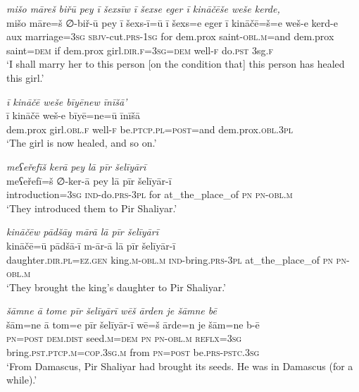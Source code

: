 \ea \label{ZP.90}
\textit{mišo māreš biřū pey ī šexsīw ī šexse eger ī kināčēše weše kerde,} \\ 
\gll mišo māre=š ∅-biř-ū pey ī šexs-ī=ū ī šexs=e eger ī kināčē=š=e weš-e kerd-e \\ 
 aux marriage\textsc{=3sg} \textsc{sbjv-}cut\textsc{.prs}\textsc{-\textsc{1sg}} for dem.prox saint\textsc{-obl}\textsc{.m}=and dem.prox saint\textsc{=dem} if dem.prox girl\textsc{.dir}\textsc{.f}\textsc{=3sg}\textsc{=dem} well\textsc{-f} do\textsc{.pst} 3sg\textsc{.f} \\ 
\glt `I shall marry her to this person [on the condition that] this person has healed this girl.'
\z 
 
\ea \label{ZP.91}
\textit{ī kināčē weše bīyēnew īnīšā’} \\ 
\gll ī kināčē weš-e bīyē=ne=ū īnīšā \\ 
 dem.prox girl\textsc{.obl}\textsc{.f} well\textsc{-f} be\textsc{.ptcp}\textsc{.pl}\textsc{=\textsc{post}}=and dem.prox\textsc{.obl}\textsc{.3pl} \\ 
\glt `The girl is now healed, and so on.'
\z 
 
\ea \label{ZP.92}
\textit{meʕeřefīš kerā pey lā pīr šelīyārī} \\ 
\gll meʕeřefī=š ∅-ker-ā pey lā pīr šelīyār-ī \\ 
 introduction\textsc{=3sg} \textsc{ind-}do\textsc{.prs}\textsc{-3pl} for at\_the\_place\_of \textsc{pn} \textsc{pn}\textsc{-obl}\textsc{.m} \\ 
\glt `They introduced them to Pir Shaliyar.'
\z 
 
\ea \label{ZP.93}
\textit{kināčēw pādšāy mārā lā pīr šelīyārī} \\ 
\gll kināčē=ū pādšā-ī m-ār-ā lā pīr šelīyār-ī \\ 
 daughter\textsc{.dir}\textsc{.pl}\textsc{\textsc{=ez.gen}} king\textsc{.m}\textsc{-obl}\textsc{.m} \textsc{ind-}bring\textsc{.prs}\textsc{-3pl} at\_the\_place\_of \textsc{pn} \textsc{pn}\textsc{-obl}\textsc{.m} \\ 
\glt `They brought the king’s daughter to Pir Shaliyar.'
\z 
 
\ea \label{ZP.95}
\textit{šāmne ā tome pīr šelīyārī wēš ārden je šāmne bē} \\ 
\gll šām=ne ā tom=e pīr šelīyār-ī wē=š ārde=n je šām=ne b-ē \\ 
 \textsc{pn}\textsc{=\textsc{post}} \textsc{dem.dist} seed\textsc{.m}\textsc{=dem} \textsc{pn} \textsc{pn}\textsc{-obl}\textsc{.m} \textsc{reflx}\textsc{=3sg} bring\textsc{.pst}\textsc{.ptcp}\textsc{.m}\textsc{=cop}\textsc{.3sg}\textsc{.m} from \textsc{pn}\textsc{=\textsc{post}} be\textsc{.prs}\textsc{-pstc}\textsc{.3sg} \\ 
\glt `From Damascus, Pir Shaliyar had brought its seeds. He was in Damascus (for a while).'
\z 
 
